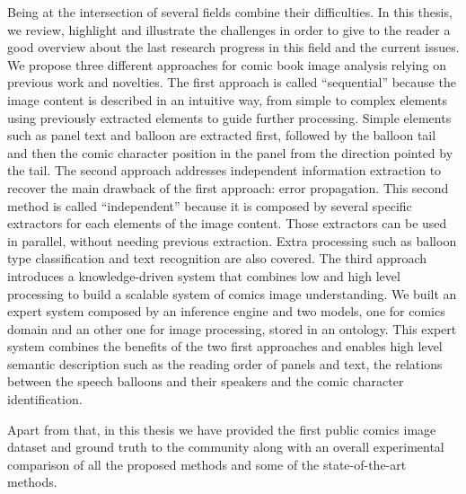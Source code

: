 Being at the intersection of several fields combine their difficulties.
In this thesis, we review, highlight and illustrate the challenges in order to give to the reader a good overview about the last research progress in this field and the current issues.
We propose three different approaches for comic book image analysis relying on previous work and novelties.
The first approach is called ``sequential'' because the image content is described in an intuitive way, from simple to complex elements using previously extracted elements to guide further processing.
Simple elements such as panel text and balloon are extracted first, followed by the balloon tail and then the comic character position in the panel from the direction pointed by the tail.
The second approach addresses independent information extraction to recover the main drawback of the first approach: error propagation.
This second method is called ``independent'' because it is composed by several specific extractors for each elements of the image content.
Those extractors can be used in parallel, without needing previous extraction.
Extra processing such as balloon type classification and text recognition are also covered.
The third approach introduces a knowledge-driven system that combines low and high level processing to build a scalable system of comics image understanding.
We built an expert system composed by an inference engine and two models, one for comics domain and an other one for image processing, stored in an ontology.
This expert system combines the benefits of the two first approaches and enables high level semantic description such as the reading order of panels and text, the relations between the speech balloons and their speakers and the comic character identification.

Apart from that, in this thesis we have provided the first public comics image dataset and ground truth to the community along with an overall experimental comparison of all the proposed methods and some of the state-of-the-art methods.



